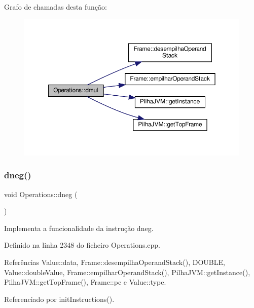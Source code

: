 Grafo de chamadas desta função\+:\nopagebreak
\begin{figure}[H]
\begin{center}
\leavevmode
\includegraphics[width=350pt]{classOperations_afe1944066f35f66d588d1a28124ebb55_cgraph}
\end{center}
\end{figure}
\mbox{\label{classOperations_a04f5d4f85b80f4c04216cd0259d3d7dc}} 
\subsubsection{\texorpdfstring{dneg()}{dneg()}}
{\footnotesize\ttfamily void Operations\+::dneg (\begin{DoxyParamCaption}{ }\end{DoxyParamCaption})\hspace{0.3cm}{\ttfamily [private]}}



Implementa a funcionalidade da instrução dneg. 



Definido na linha 2348 do ficheiro Operations.\+cpp.



Referências Value\+::data, Frame\+::desempilha\+Operand\+Stack(), D\+O\+U\+B\+LE, Value\+::double\+Value, Frame\+::empilhar\+Operand\+Stack(), Pilha\+J\+V\+M\+::get\+Instance(), Pilha\+J\+V\+M\+::get\+Top\+Frame(), Frame\+::pc e Value\+::type.



Referenciado por init\+Instructions().

